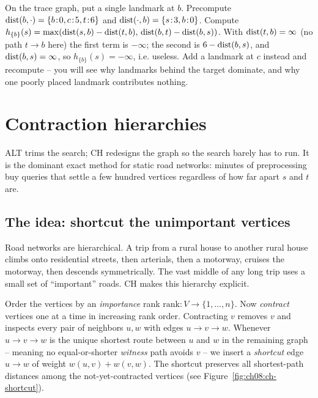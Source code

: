 \begin{labbox}
On the trace graph, put a single landmark at $b$. Precompute
$\operatorname{dist}(b,\cdot)=\{b\!:\!0, c\!:\!5, t\!:\!6\}$ and $\operatorname{dist}(\cdot,b)=\{s\!:\!3,
b\!:\!0\}$. Compute $h_{\{b\}}(s)=\max(\operatorname{dist}(s,b)-\operatorname{dist}(t,b),\,
\operatorname{dist}(b,t)-\operatorname{dist}(b,s))$. With $\operatorname{dist}(t,b)=\infty$ (no path $t\to b$ here) the
first term is $-\infty$; the second is $6-\operatorname{dist}(b,s)$, and $\operatorname{dist}(b,s)=\infty$,
so $h_{\{b\}}(s)=-\infty$, i.e. useless. Add a landmark at $c$ instead and
recompute -- you will see why landmarks behind the target dominate, and why one
poorly placed landmark contributes nothing.
\end{labbox}

\section{Contraction hierarchies}
\label{ch08:ch}

ALT trims the search; CH redesigns the graph so the search barely has to run.
It is the dominant exact method for static road networks: minutes of
preprocessing buy queries that settle a few hundred vertices regardless of how
far apart $s$ and $t$ are.

\subsection{The idea: shortcut the unimportant vertices}

Road networks are hierarchical. A trip from a rural house to another rural house
climbs onto residential streets, then arterials, then a motorway, cruises the
motorway, then descends symmetrically. The vast middle of any long trip uses a
small set of ``important'' roads. CH makes this hierarchy explicit.

Order the vertices by an \emph{importance} rank $\mathrm{rank}:V\to\{1,\dots,n\}$.
Now \emph{contract} vertices one at a time in increasing rank order. Contracting
$v$ removes $v$ and inspects every pair of neighbors $u,w$ with edges
$u\to v\to w$. Whenever $u\to v\to w$ is the unique shortest route between $u$
and $w$ in the remaining graph -- meaning no equal-or-shorter \emph{witness}
path avoids $v$ -- we insert a \emph{shortcut} edge $u\to w$ of weight
$w(u,v)+w(v,w)$. The shortcut preserves all shortest-path distances among the
not-yet-contracted vertices (see Figure~\ref{fig:ch08:ch-shortcut}).

